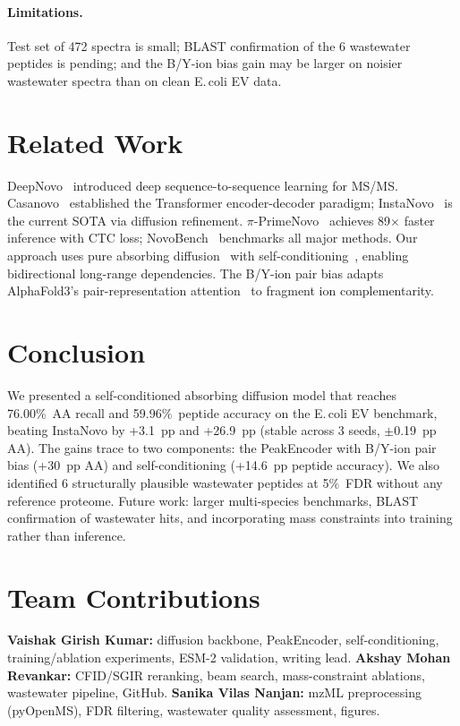 \documentclass{article}
\begin{document}
\paragraph{Limitations.}
Test set of 472 spectra is small; BLAST confirmation of the 6 wastewater peptides is pending; and
the B/Y-ion bias gain may be larger on noisier wastewater spectra than on clean E.\,coli EV data.

\section{Related Work}

DeepNovo~\citep{tran2017deepnovo} introduced deep sequence-to-sequence learning for MS/MS.
Casanovo~\citep{casanovo2023} established the Transformer encoder-decoder paradigm; InstaNovo~\citep{instanovo2024} is the current SOTA via diffusion refinement. $\pi$-PrimeNovo~\citep{zhang2025primenovo} achieves 89$\times$ faster inference with CTC loss; NovoBench~\citep{zhou2024novobench} benchmarks all major methods.
Our approach uses pure absorbing diffusion~\citep{austin2021structured,hoogeboom2021argmax} with self-conditioning~\citep{chen2022analog}, enabling bidirectional long-range dependencies.
The B/Y-ion pair bias adapts AlphaFold3's pair-representation attention~\citep{abramson2024alphafold3} to fragment ion complementarity.

\section{Conclusion}

We presented a self-conditioned absorbing diffusion model that reaches 76.00\%~AA recall and
59.96\%~peptide accuracy on the E.\,coli EV benchmark, beating InstaNovo by +3.1~pp and +26.9~pp
(stable across 3 seeds, $\pm$0.19~pp AA).
The gains trace to two components: the PeakEncoder with B/Y-ion pair bias (+30~pp AA) and
self-conditioning (+14.6~pp peptide accuracy).
We also identified 6 structurally plausible wastewater peptides at 5\%~FDR without any reference
proteome.
Future work: larger multi-species benchmarks, BLAST confirmation of wastewater hits, and
incorporating mass constraints into training rather than inference.

\section*{Team Contributions}
\textbf{Vaishak Girish Kumar:} diffusion backbone, PeakEncoder, self-conditioning, training/ablation experiments, ESM-2 validation, writing lead.
\textbf{Akshay Mohan Revankar:} CFID/SGIR reranking, beam search, mass-constraint ablations, wastewater pipeline, GitHub.
\textbf{Sanika Vilas Nanjan:} mzML preprocessing (pyOpenMS), FDR filtering, wastewater quality assessment, figures.
\end{document}
